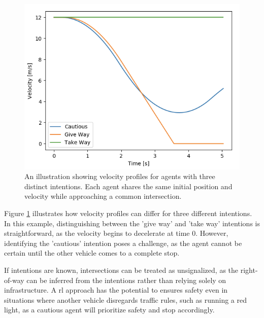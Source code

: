 \begin{figure}[h]
	\centering
	\includegraphics[width=0.6\columnwidth]{YourThesis/papers/mpc/figures/velocity_profiles_agents.png}

	\caption{An illustration showing velocity profiles for agents with three distinct intentions. Each agent shares the same initial position and velocity while approaching a common intersection.}
	\label{fig:intro_intention_profiles}
\end{figure}

Figure \ref{fig:intro_intention_profiles} illustrates how velocity profiles can differ for three different intentions. In this example, distinguishing between the 'give way' and 'take way' intentions is straightforward, as the velocity begins to decelerate at time $0$. However, identifying the 'cautious' intention poses a challenge, as the agent cannot be certain until the other vehicle comes to a complete stop.

If intentions are known, intersections can be treated as unsignalized, as the right-of-way can be inferred from the intentions rather than relying solely on infrastructure. A \gls{rl} approach has the potential to ensures safety even in situations where another vehicle disregards traffic rules, such as running a red light, as a cautious agent will prioritize safety and stop accordingly.

